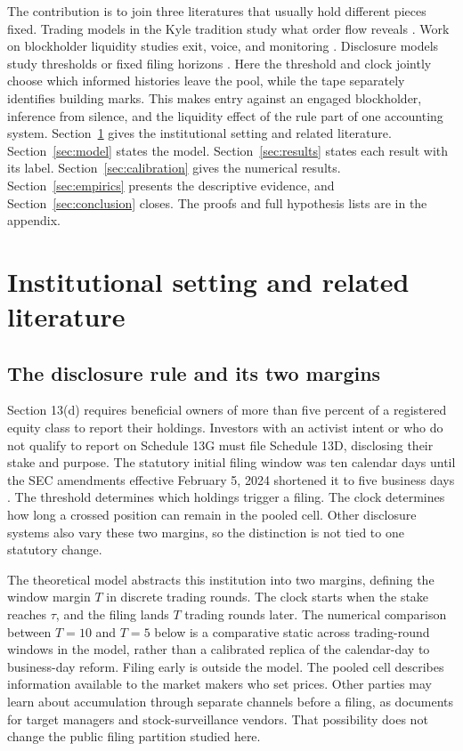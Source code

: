 \documentclass[11pt]{article}
\begin{document}
The contribution is to join three literatures that usually hold different pieces fixed. Trading
models in the Kyle tradition study what order flow reveals \citep{Kyle1985,GlostenMilgrom1985}.
Work on blockholder liquidity studies exit, voice, and monitoring \citep{Maug1998,KahnWinton1998}.
Disclosure models study thresholds or fixed filing horizons \citep{BackEtAl2018,CorumLevit2019}.
Here the threshold and clock jointly choose which informed histories leave the pool, while the tape
separately identifies building marks. This makes entry against an engaged blockholder, inference
from silence, and the liquidity effect of the rule part of one accounting system.
Section~\ref{sec:lit} gives the institutional setting and related literature.
Section~\ref{sec:model} states the model. Section~\ref{sec:results} states each result with its
label. Section~\ref{sec:calibration} gives the numerical results. Section~\ref{sec:empirics}
presents the descriptive evidence, and Section~\ref{sec:conclusion} closes. The proofs and full
hypothesis lists are in the appendix.

\section{Institutional setting and related literature}
\label{sec:lit}

\subsection{The disclosure rule and its two margins}
\label{sec:institutional}

Section 13(d) requires beneficial owners of more than five percent of a registered equity class
to report their holdings. Investors with an activist intent or who do not qualify to report on
Schedule 13G must file Schedule 13D, disclosing their stake and purpose. The statutory initial
filing window was ten calendar days until the SEC amendments effective February 5, 2024 shortened
it to five business days \citep{SEC2023}. The threshold determines which holdings trigger a filing.
The clock determines how long a crossed position can remain in the pooled cell. Other disclosure
systems also vary these two margins, so the distinction is not tied to one statutory change.

The theoretical model abstracts this institution into two margins, defining the window margin
$T$ in discrete trading rounds. The clock starts when the stake reaches $\tau$, and the filing
lands $T$ trading rounds later. The numerical comparison between $T=10$ and $T=5$ below is a
comparative static across trading-round windows in the model, rather than a calibrated replica
of the calendar-day to business-day reform. Filing early is outside the model. The pooled cell
describes information available to the market makers who set prices. Other parties may learn
about accumulation through separate channels before a filing, as \citet{Zeng2026} documents
for target managers and stock-surveillance vendors. That possibility does not change the public
filing partition studied here.
\end{document}
